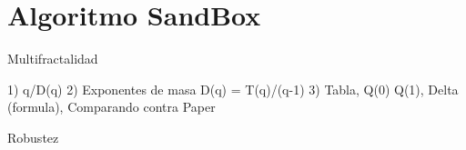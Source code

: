 \section{Algoritmo SandBox}


Multifractalidad

1) q/D(q)
2) Exponentes de masa D(q) = T(q)/(q-1)
3) Tabla, Q(0) Q(1), Delta (formula), Comparando contra Paper

Robustez
